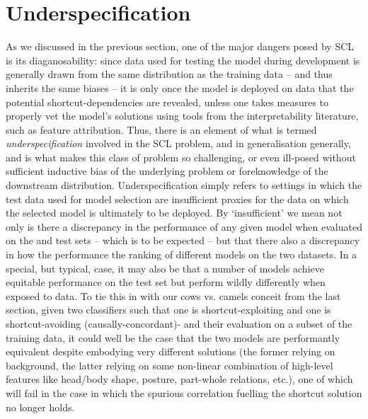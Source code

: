 

\section{Underspecification}\label{sub:underspecification}
 
As we discussed in the previous section, one of the major dangers posed by SCL is its
diaganosability: since data used for testing the model during development is generally drawn from
the same distribution as the training data -- and thus inherits the same biases -- it is only once
the model is deployed on \ood{} data that the potential shortcut-dependencies are revealed, unless
one takes measures to properly vet the model's solutions using tools from the interpretability
literature, such as feature attribution.
%
Thus, there is an element of what is termed \emph{underspecification} involved in the SCL problem,
and in \ood{} generalisation generally, and is what makes this class of problem so challenging, or
even ill-posed without sufficient inductive bias of the underlying problem or foreknowledge of the
downstream distribution.
%
Underspecification simply refers to settings in which the \iid{} test data used for model selection are
insufficient proxies for the data on which the selected model is ultimately to be deployed.
%
By `insufficient' we mean not only is there a discrepancy in the performance of any given model
when evaluated on the \iid{} and \ood{} test sets -- which is to be expected -- but that there also
a discrepancy in how the performance the ranking of different models on the two datasets.
%
In a special, but typical, case, it may also be that a number of models achieve equitable
performance on the \iid{} test set but perform wildly differently when exposed to \ood{} data.
%
To tie this in with our cows vs. camels conceit from the last section, given two classifiers such
that one is shortcut-exploiting and one is shortcut-avoiding (causally-concordant)- and their
evaluation on a subset of the training data, it could well be the case that the two models are
performantly equivalent despite embodying very different solutions (the former relying on
background, the latter relying on some non-linear combination of high-level features like head/body
shape, posture, part-whole relations, etc.), one of which will fail in the \ood{} case in which the
spurious correlation fuelling the shortcut solution no longer holds.

